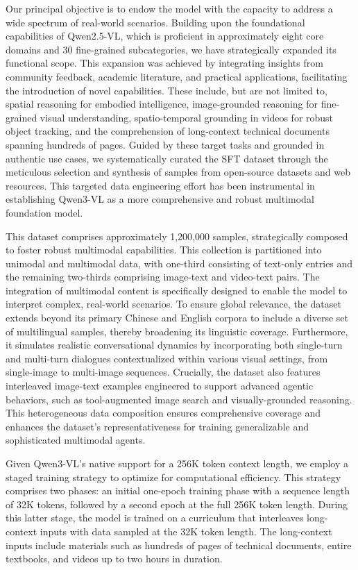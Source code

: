 \documentclass{article} %
\begin{document}
Our principal objective is to endow the model with the capacity to address a wide spectrum of real-world scenarios. Building upon the foundational capabilities of Qwen2.5-VL, which is proficient in approximately eight core domains and 30 fine-grained subcategories, we have strategically expanded its functional scope. This expansion was achieved by integrating insights from community feedback, academic literature, and practical applications, facilitating the introduction of novel capabilities. These include, but are not limited to, spatial reasoning for embodied intelligence, image-grounded reasoning for fine-grained visual understanding, spatio-temporal grounding in videos for robust object tracking, and the comprehension of long-context technical documents spanning hundreds of pages. Guided by these target tasks and grounded in authentic use cases, we systematically curated the SFT dataset through the meticulous selection and synthesis of samples from open-source datasets and web resources. This targeted data engineering effort has been instrumental in establishing Qwen3-VL as a more comprehensive and robust multimodal foundation model.

This dataset comprises approximately 1,200,000 samples, strategically composed to foster robust multimodal capabilities. This collection is partitioned into unimodal and multimodal data, with one-third consisting of text-only entries and the remaining two-thirds comprising image-text and video-text pairs. The integration of multimodal content is specifically designed to enable the model to interpret complex, real-world scenarios. To ensure global relevance, the dataset extends beyond its primary Chinese and English corpora to include a diverse set of multilingual samples, thereby broadening its linguistic coverage. Furthermore, it simulates realistic conversational dynamics by incorporating both single-turn and multi-turn dialogues contextualized within various visual settings, from single-image to multi-image sequences. Crucially, the dataset also features interleaved image-text examples engineered to support advanced agentic behaviors, such as tool-augmented image search and visually-grounded reasoning. This heterogeneous data composition ensures comprehensive coverage and enhances the dataset's representativeness for training generalizable and sophisticated multimodal agents.

Given Qwen3-VL's native support for a 256K token context length, we employ a staged training strategy to optimize for computational efficiency. This strategy comprises two phases: an initial one-epoch training phase with a sequence length of 32K tokens, followed by a second epoch at the full 256K token length. During this latter stage, the model is trained on a curriculum that interleaves long-context inputs with data sampled at the 32K token length. The long-context inputs include materials such as hundreds of pages of technical documents, entire textbooks, and videos up to two hours in duration.
\end{document}
